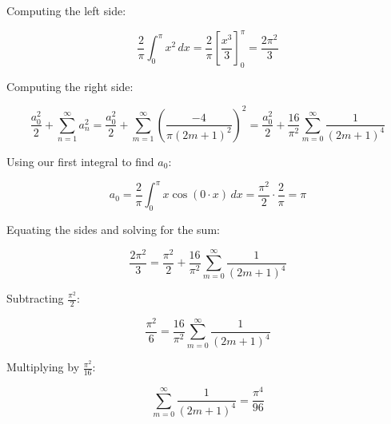 \documentclass{report}
\begin{document}
{Computing the left side:

\[
\frac{2}{\pi} \int_0^\pi x^2 \, dx = \frac{2}{\pi} \left[ \frac{x^3}{3} \right]^\pi_0 = \frac{2\pi^2}{3}
\]

Computing the right side:

\[
\frac{a_0^2}{2} + \sum_{n=1}^\infty a_n^2 = \frac{a_0^2}{2} + \sum_{m=1}^\infty \left( \frac{-4}{\pi (2m+1)^2} \right)^2 = \frac{a_0^2}{2} + \frac{16}{\pi^2} \sum_{m=0}^\infty \frac{1}{(2m+1)^4}
\]

Using our first integral to find \(a_0\):

\[
a_0 = \frac{2}{\pi} \int_0^\pi x \cos(0 \cdot x) \, dx = \frac{\pi^2}{2} \cdot \frac{2}{\pi} = \pi
\]

Equating the sides and solving for the sum:

\[
\frac{2\pi^2}{3} = \frac{\pi^2}{2} + \frac{16}{\pi^2} \sum_{m=0}^\infty \frac{1}{(2m+1)^4}
\]

Subtracting \(\frac{\pi^2}{2}\):

\[
\frac{\pi^2}{6} = \frac{16}{\pi^2} \sum_{m=0}^\infty \frac{1}{(2m+1)^4}
\]

Multiplying by \(\frac{\pi^2}{16}\):

\[
\sum_{m=0}^\infty \frac{1}{(2m+1)^4} = \frac{\pi^4}{96}
\]
}
\end{document}

